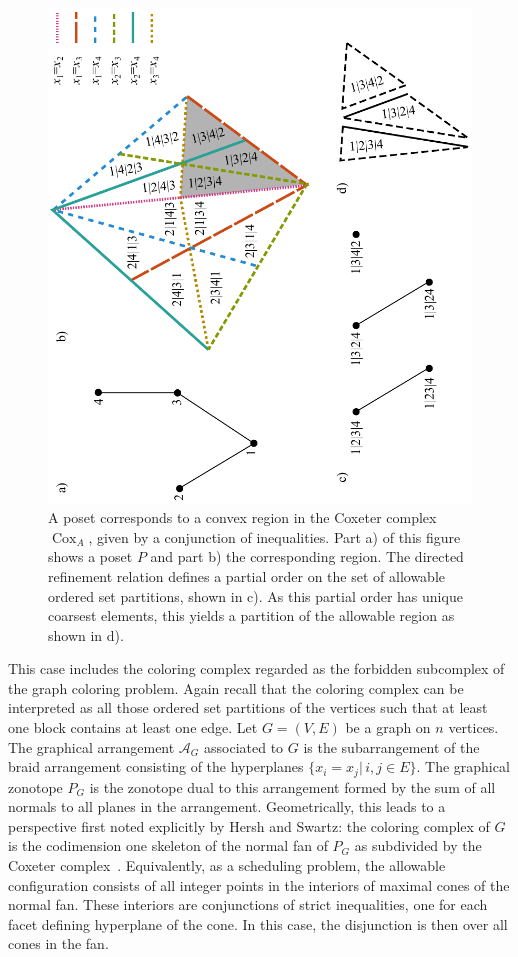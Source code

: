 \documentclass[12pt,reqno]{amsart}
\numberwithin{definition}{section}
\theoremstyle{definition}
\newcommand{\cox}{\operatorname{Cox}}
\begin{document}
\begin{figure}[h]
\includegraphics[angle=270,width=5in]{coxeter_complex_poset}
\caption{A poset corresponds to a convex region in the Coxeter complex $\cox_A$, given by a conjunction of inequalities. Part a) of this figure shows a poset $P$ and part b) the corresponding region. The directed refinement relation defines a partial order on the set of allowable ordered set partitions, shown in c). As this partial order has unique coarsest elements, this yields a partition of the allowable region as shown in d).}
\label{fig:poset}
\end{figure}

This case  includes the coloring complex regarded as the forbidden
subcomplex of the graph coloring problem.  Again recall that the
coloring complex can be interpreted as all those ordered set
partitions of the vertices such that at least one block contains at
least one edge.  Let $G=(V,E)$ be a graph on $n$ vertices.  The
graphical arrangement $\mathcal{A}_G$ associated to $G$ is the
subarrangement of the braid arrangement consisting of the hyperplanes
$\{x_i = x_j | \, i,j \in E\}$. The graphical zonotope ${P}_G$ is the
zonotope dual to this arrangement formed by the sum of all normals to
all planes in the arrangement.  Geometrically, this leads to a
perspective first noted explicitly by Hersh and Swartz: the coloring
complex of $G$ is the codimension one skeleton of the normal fan of ${P}_G$
as subdivided by the Coxeter complex~\cite{HS}.  Equivalently, as a scheduling problem,  the
allowable configuration consists of all integer points in the
interiors of maximal cones of the normal fan.  These interiors are
conjunctions of strict inequalities, one for each facet defining
hyperplane of the cone.  In this case, the disjunction is then over
all cones in the fan.
\end{document}
